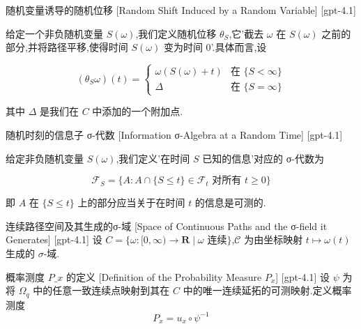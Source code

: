 \documentclass[UTF8]{ctexart}
\begin{document}
    \begin{dfn}
        {随机变量诱导的随机位移}
        [Random Shift Induced by a Random Variable]
        [gpt-4.1]
        
给定一个非负随机变量 $S(\omega)$,我们定义随机位移 $\theta_{S}$,它'截去 $\omega$ 在 $S(\omega)$ 之前的部分,并将路径平移,使得时间 $S(\omega)$ 变为时间 0'.具体而言,设

\[
(\theta_{S} \omega)(t) = \begin{cases}
\omega(S(\omega) + t) & \text{在 } \{ S < \infty \} \\
\Delta & \text{在 } \{ S = \infty \}
\end{cases}
\]

其中 $\Delta$ 是我们在 $C$ 中添加的一个附加点.

    \end{dfn}
    
    
    
    \begin{dfn}
        {随机时刻的信息子 σ-代数}
        [Information σ-Algebra at a Random Time]
        [gpt-4.1]
        
给定非负随机变量 $S(\omega)$,我们定义'在时间 $S$ 已知的信息'对应的 σ-代数为

\[
\mathcal{F}_{S} = \{ A : A \cap \{ S \leq t \} \in \mathcal{F}_{t} \text{ 对所有 } t \geq 0 \}
\]

即 $A$ 在 $\{ S \leq t \}$ 上的部分应当关于在时间 $t$ 的信息是可测的.

    \end{dfn}
    
    
    
    \begin{dfn}
        {连续路径空间及其生成的σ-域}
        [Space of Continuous Paths and the σ-field it Generates]
        [gpt-4.1]
        设 $C = \{\omega : [0, \infty) \to \mathbf{R} \mid \omega \text{ 连续} \}$,$\mathcal{C}$ 为由坐标映射 $t \mapsto \omega(t)$ 生成的 $\sigma$-域.
    \end{dfn}
    
    
    
    \begin{dfn}
        {概率测度 $P\_x$ 的定义}
        [Definition of the Probability Measure $P_x$]
        [gpt-4.1]
        设 $\psi$ 为将 $\Omega_q$ 中的任意一致连续点映射到其在 $C$ 中的唯一连续延拓的可测映射.定义概率测度
\[
P_x = 
u_x \circ \psi^{-1}
\]

    \end{dfn}
    
\end{document}
